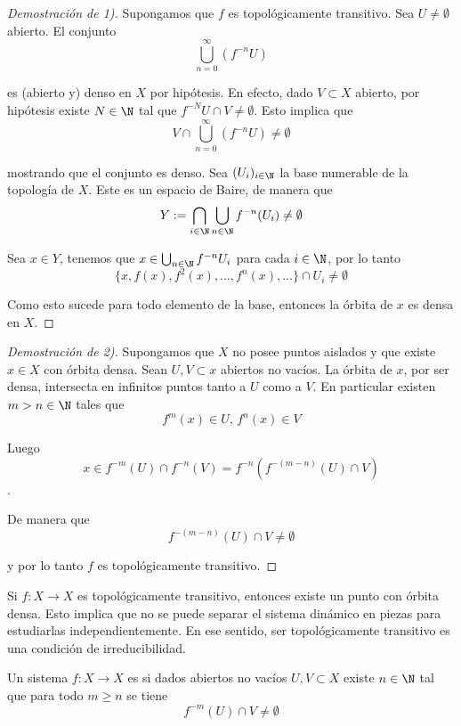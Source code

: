 \documentclass[	docname= Sistemas\ Din\'amicos,
				finished=1,
				semester=1,
				year=2017,
				professor=Godofredo\ Iommi,
				sigla=MAT2565]{apunte}
\begin{document}
\begin{proof}[Demostración de 1)] Supongamos que $f$ es topológicamente transitivo. Sea $U \neq \emptyset$ abierto. El conjunto
	$$\bigcup_{n=0}^{\infty} (f^{-n}U)$$

es (abierto y) denso en $X$ por hipótesis. En efecto, dado $V \subset X$ abierto, por hipótesis existe $N \in \N$ tal que $f^{-N}U \cap V \neq \emptyset$. Esto implica que
	$$V \cap \bigcup_{n=0}^{\infty} (f^{-n}U) \neq \emptyset$$

mostrando que el conjunto es denso. Sea $(U_{i})_{i \in \N}$ la base numerable de la topología de $X$. Este es un espacio de Baire, de manera que
	$$Y := \bigcap_{i \in \N} \bigcup_{n \in \N} f^{-n}(U_{i}) \neq \emptyset$$

Sea $x  \in Y$, tenemos que $x \in \bigcup_{n \in \N} f^{-n}U_{i}$ para cada $i \in \N$, por lo tanto
	$$\{x, f(x), f^{2}(x), \ldots, f^{n}(x), \ldots\} \cap U_{i} \neq \emptyset$$

Como esto sucede para todo elemento de la base, entonces la órbita de $x$ es densa en $X$.
\end{proof}

\begin{proof}[Demostración de 2)] Supongamos que $X$ no posee puntos aislados y que existe $x \in X$ con órbita densa. Sean $U, V \subset x$ abiertos no vacíos. La órbita de $x$, por ser densa, intersecta en infinitos puntos tanto a $U$ como a $V$. En particular existen $m > n \in \N$ tales que
	$$f^{m}(x) \in U, \, f^{n}(x)  \in V$$

Luego 
	$$x \in f^{-m}(U) \cap f^{-n}(V) = f^{-n}\left(f^{-(m-n)}(U) \cap V \right)$$. 

De manera que
	$$f^{-(m-n)}(U) \cap V \neq \emptyset$$
	
y por lo tanto $f$ es topológicamente transitivo.
\end{proof}

\begin{obst} Si $f: X \to X$ es topológicamente transitivo, entonces existe un punto con órbita densa. Esto implica que no se puede separar el sistema dinámico en piezas para estudiarlas independientemente. En ese sentido, ser topológicamente transitivo es una condición de irreducibilidad.
\end{obst}

\begin{defn} Un sistema $f: X \to X$ es  si dados abiertos no vacíos $U,V \subset X$ existe $n \in \N$ tal que para todo $m \geq n$ se tiene
	$$f^{-m}(U) \cap V \neq \emptyset$$
\end{defn}
\end{document}
